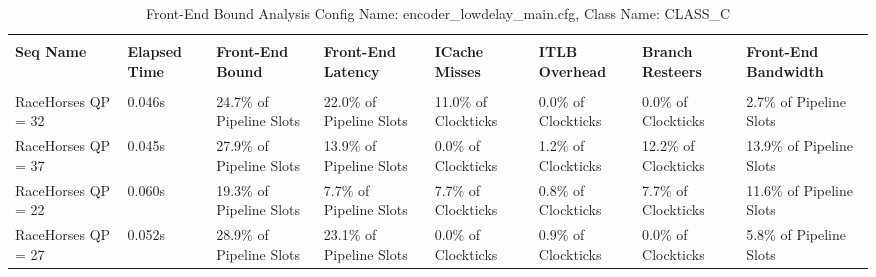 \documentclass{article}%
\begin{document}
\begin{longtabu}{| X[l] | X[l] | X[l] | X[l] | X[l] | X[l] | X[l] | X[l] |}%
\caption{%
Front{-}End Bound Analysis\newline%
 Config Name: encoder\_lowdelay\_main.cfg,\newline%
 Class Name: CLASS\_C\newline%
%
}%
\hline%
&&&&&&&\\%
\textbf{Seq Name}&\textbf{Elapsed Time}&\textbf{Front{-}End Bound}&\textbf{Front{-}End Latency}&\textbf{ICache Misses}&\textbf{ITLB Overhead}&\textbf{Branch Resteers}&\textbf{Front{-}End Bandwidth}\\%
&&&&&&&\\%
\hline%
\endhead%
RaceHorses\newline%
 QP = 32&0.046s&24.7\% of Pipeline Slots&22.0\% of Pipeline Slots&11.0\% of Clockticks&0.0\% of Clockticks&0.0\% of Clockticks&2.7\% of Pipeline Slots\\%
\hline%
RaceHorses\newline%
 QP = 37&0.045s&27.9\% of Pipeline Slots&13.9\% of Pipeline Slots&0.0\% of Clockticks&1.2\% of Clockticks&12.2\% of Clockticks&13.9\% of Pipeline Slots\\%
\hline%
RaceHorses\newline%
 QP = 22&0.060s&19.3\% of Pipeline Slots&7.7\% of Pipeline Slots&7.7\% of Clockticks&0.8\% of Clockticks&7.7\% of Clockticks&11.6\% of Pipeline Slots\\%
\hline%
RaceHorses\newline%
 QP = 27&0.052s&28.9\% of Pipeline Slots&23.1\% of Pipeline Slots&0.0\% of Clockticks&0.9\% of Clockticks&0.0\% of Clockticks&5.8\% of Pipeline Slots\\%
\hline%
\end{longtabu}%
\newpage%
\end{document}
